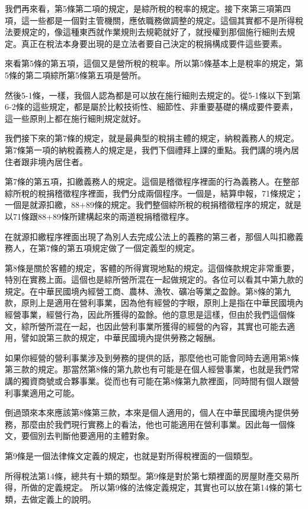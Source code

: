 \documentclass[]{ctexbook}
\begin{document}
我們再來看，第5條第二項的規定，是綜所稅的稅率的規定。接下來第三項第四項，這一些都是一個對主管機關，應依職務做調整的規定。這個其實都不是所得稅法要規定的，像這種東西就作業規則去規範就好了，就授權到那個施行細則去規定。真正在稅法本身要出現的是立法者要自己決定的稅捐構成要件這些要素。

來看第5條的第五項，這個又是營所稅的稅率。所以第5條基本上是稅率的規定，第5條的第二項綜所第5條第五項是營所。

然後5-1條，一樣，我個人認為都是可以放在施行細則去規定的。從5-1條以下到第6-2條的這些規定，都是屬於比較技術性、細節性、非重要基礎的構成要件要素，這一些原則上都在施行細則規定就好。

我們接下來的第7條的規定，就是最典型的稅捐主體的規定，納稅義務人的規定。第7條第一項的納稅義務人的規定是，我們下個禮拜上課的重點。我們講的境內居住者跟非境內居住者。

第7條的第五項，扣繳義務人的規定。這個是稽徵程序裡面的行為義務人。在整部綜所稅的稅捐稽徵程序裡面，我們分成兩個程序。一個是，結算申報，71條規定；一個是就源扣繳，88+89條的規定。我們整個綜所稅的稅捐稽徵程序的規定，就是以71條跟88+89條所建構起來的兩道稅捐稽徵程序。

在就源扣繳程序裡面出現了為別人去完成公法上的義務的第三者，那個人叫扣繳義務人，在第7條的第五項規定做了一個定義型的規定。

第8條是關於客體的規定，客體的所得實現地點的規定。這個條款規定非常重要，特別在實務上面。這個也是綜所營所混在一起做規定的。各位可以看其中第九款的規定。在中華民國境內經營工商、農林、漁牧、礦冶等業之盈餘。第8條的第九款，原則上是適用在營利事業，因為他有經營的字眼，原則上是指在中華民國境內經營事業，經營行為，因此所獲得的盈餘。他的意思是這樣，但由於我們這個條文，綜所營所混在一起，也因此營利事業所獲得的經營的內容，其實也可能去適用，譬如說第三款的規定，中華民國境內提供勞務之報酬。

如果你經營的營利事業涉及到勞務的提供的話，那麼他也可能會同時去適用第8條第三款的規定。那當然第8條的第九款也有可能是在個人經營事業，也就是我們常講的獨資商號或合夥事業。從而也有可能在第8條第九款裡面，同時間有個人跟營利事業適用之可能。

倒過頭來本來應該第8條第三款，本來是個人適用的，個人在中華民國境內提供勞務，那麼由於我們現行實務上的看法，他也可能適用在營利事業。因此每一個條文，要個別去判斷他要適用的主體對象。

第9條是一個法律條文定義的規定，也就是對所得稅裡面的一個類型。

所得稅法第14條，總共有十類的類型。第9條是對於第七類裡面的房屋財產交易所得，所做的定義規定。
所以第9條的法條定義規定，其實也可以放在第14條的第七類，去做定義上的說明。
\end{document}
